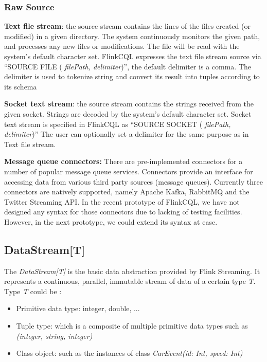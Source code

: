 \subsubsection*{Raw Source}


\textbf{Text file stream}: the source stream contains the lines of the files created (or modified) in a given directory. The system continuously monitors the given path, and processes any new files or modifications. The file will be read with the system’s default character set. FlinkCQL expresses the text file stream source via ``SOURCE FILE ( \textit{filePath, delimiter})'', the default delimiter is a comma. The delimiter is used to tokenize string and convert its result into tuples according to its schema


\textbf{Socket text stream}: the source stream contains the strings received from the given socket. Strings are decoded by the system’s default character set. Socket text stream is specified in FlinkCQL as ``SOURCE SOCKET ( \textit{filePath, delimiter})''
The user can optionally set a delimiter for the same purpose as in Text file stream.


\textbf{Message queue connectors:} There are pre-implemented connectors for a number of popular message queue services. Connectors provide an interface for accessing data from various third party sources (message queues). Currently three connectors are natively supported, namely Apache Kafka, RabbitMQ and the Twitter Streaming API. In the recent prototype of FlinkCQL, we have not designed any syntax for those connectors due to lacking of testing facilities. However, in the next prototype, we could extend its syntax at ease.

\subsection*{DataStream[T]}
The \textit{DataStream[T]} is the basic data abstraction provided by Flink Streaming. It represents a continuous, parallel, immutable stream of data of a certain type \textit{T}. Type \textit{T} could be :
\begin{itemize}
\item Primitive data type: integer, double, ...
\item Tuple type: which is a composite of multiple primitive data types such as \textit{(integer, string, integer)}
\item Class object: such as the instances of class \textit{CarEvent(id: Int, speed: Int)}
\end{itemize} 

